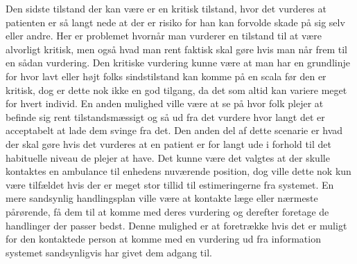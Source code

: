 Den sidste tilstand der kan være er en kritisk tilstand, hvor det vurderes at patienten er så langt nede at der er risiko for han kan forvolde skade på sig selv eller andre.
Her er problemet hvornår man vurderer en tilstand til at være alvorligt kritisk, men også hvad man rent faktisk skal gøre hvis man når frem til en sådan vurdering.
Den kritiske vurdering kunne være at man har en grundlinje for hvor lavt eller højt folks sindstilstand kan komme på en scala før den er kritisk, dog er dette nok ikke en god tilgang, da det som altid kan variere meget for hvert individ.
En anden mulighed ville være at se på hvor folk plejer at befinde sig rent tilstandsmæssigt og så ud fra det vurdere hvor langt det er acceptabelt at lade dem svinge fra det.
Den anden del af dette scenarie er hvad der skal gøre hvis det vurderes at en patient er for langt ude i forhold til det habituelle niveau de plejer at have.
Det kunne være det valgtes at der skulle kontaktes en ambulance til enhedens nuværende position, dog ville dette nok kun være tilfældet hvis der er meget stor tillid til estimeringerne fra systemet.
En mere sandsynlig handlingsplan ville være at kontakte læge eller nærmeste pårørende, få dem til at komme med deres vurdering og derefter foretage de handlinger der passer bedst.
Denne mulighed er at foretrække hvis det er muligt for den kontaktede person at komme med en vurdering ud fra information systemet sandsynligvis har givet dem adgang til.